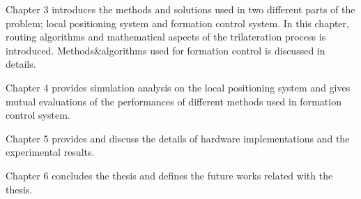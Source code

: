 Chapter 3 introduces the methods and solutions used in two different parts of the problem; local positioning system and formation control system. In this chapter, routing algorithms and mathematical aspects of the trilateration process is introduced. Methods$\&$algorithms used for formation control is discussed in details.

Chapter 4 provides simulation analysis on the local positioning system and gives mutual evaluations of the performances of different methods used in formation control system.

Chapter 5 provides and discuss the details of hardware implementations and the experimental results.

Chapter 6 concludes the thesis and defines the future works related with the thesis.